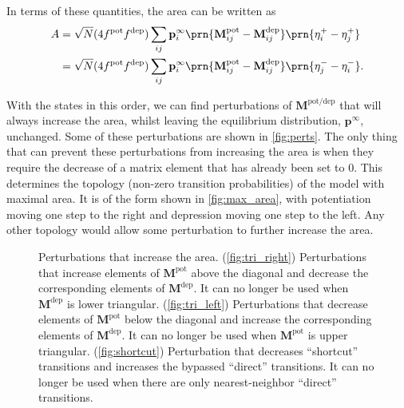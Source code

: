 \documentclass{article} %
\newcommand{\pr}{\mathbf{p}}
\newcommand{\eq}{\pr^\infty}
\newcommand{\M}{\mathbf{M}}
\newcommand{\pot}{^{\text{pot}}}
\newcommand{\dep}{^{\text{dep}}}
\newcommand{\potdep}{^{\text{pot/dep}}}
\begin{document}
In terms of these quantities, the area can be written as
%
\begin{equation}\label{eq:areaEta}
\begin{aligned}
  A &= \sqrt{N}(4f\pot f\dep) \sum_{ij} \eq_i \prn{\M\pot_{ij}-\M\dep_{ij}} \prn{\eta^+_i-\eta^+_j}\\
    &= \sqrt{N}(4f\pot f\dep) \sum_{ij} \eq_i \prn{\M\pot_{ij}-\M\dep_{ij}} \prn{\eta^-_j-\eta^-_i}.
\end{aligned}
\end{equation}
%


With the states in this order, we can find perturbations of $\M\potdep$ that will always increase the area, whilst leaving the equilibrium distribution, $\eq$, unchanged.
Some of these perturbations are shown in \autoref{fig:perts}.
The only thing that can prevent these perturbations from increasing the area is when they require the decrease of a matrix element that has already been set to 0.
This determines the topology (non-zero transition probabilities) of the model with maximal area.
It is of the form shown in \autoref{fig:max_area}, with potentiation moving one step to the right and depression moving one step to the left.
Any other topology would allow some perturbation to further increase the area.


\begin{figure}[tbp]
 \begin{center}
 \begin{myenuma}
  \item{}\label{fig:tri_right}\hp
  \item{}\label{fig:tri_left}\hp
  \item{}\label{fig:shortcut}
 \end{myenuma}
 \end{center}
  \caption{Perturbations that increase the area.
  (\ref{fig:tri_right}) Perturbations that increase elements of $\M\pot$ above the diagonal and decrease the corresponding elements of $\M\dep$. It can no longer be used when $\M\dep$ is lower triangular.
  (\ref{fig:tri_left}) Perturbations that decrease elements of $\M\pot$ below the diagonal and increase the corresponding elements of $\M\dep$. It can no longer be used when $\M\pot$ is upper triangular.
  (\ref{fig:shortcut}) Perturbation that decreases ``shortcut'' transitions and increases the bypassed ``direct'' transitions. It can no longer be used when there are only nearest-neighbor ``direct'' transitions.
  }\label{fig:perts}
\end{figure}
\end{document}
